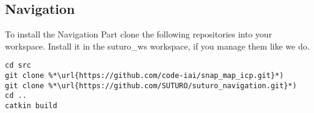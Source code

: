 \documentclass[main.tex]{subfiles}
\begin{document}
\subsection{Navigation}
To install the Navigation Part clone the following repositories into your workspace. 	Install it in the suturo\_ws workspace, if you manage them like we do.
\begin{lstlisting}
cd src
git clone %*\url{https://github.com/code-iai/snap_map_icp.git}*)
git clone %*\url{https://github.com/SUTURO/suturo_navigation.git}*)
cd ..
catkin build  
\end{lstlisting}
\end{document}
